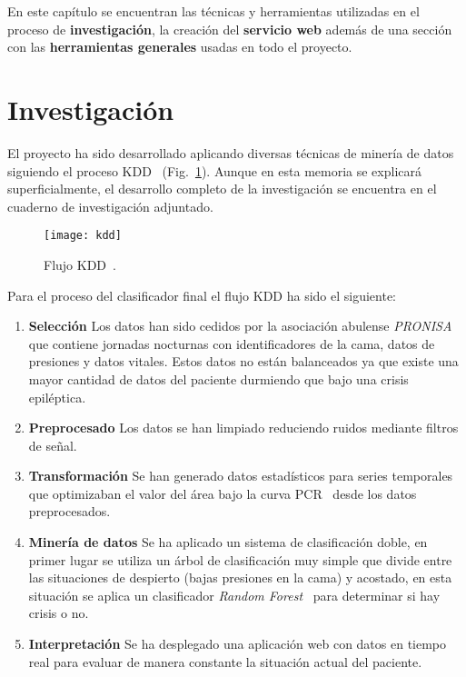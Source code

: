 
En este capítulo se encuentran las técnicas y herramientas utilizadas en el proceso de \textbf{investigación}, la creación del \textbf{servicio web} además de una sección con las \textbf{herramientas generales} usadas en todo el proyecto.

\section{Investigación}

El proyecto ha sido desarrollado aplicando diversas técnicas de minería de datos siguiendo el proceso KDD~\cite{ubu:mineria1} (Fig.~\ref{fig:kdd}). Aunque en esta memoria se explicará superficialmente, el desarrollo completo de la investigación se encuentra en el cuaderno de investigación adjuntado.

\begin{figure}
	\centering
	\texttt{[image: kdd]}
	\caption{Flujo KDD~\cite{fayyad1996data}.}
	\label{fig:kdd}
\end{figure}

Para el proceso del clasificador final el flujo KDD ha sido el siguiente:

\begin{enumerate}
	\item \textbf{Selección}
		Los datos han sido cedidos por la asociación abulense \textit{PRONISA} que contiene jornadas nocturnas con identificadores de la cama, datos de presiones y datos vitales. Estos datos no están balanceados ya que existe una mayor cantidad de datos del paciente durmiendo que bajo una crisis epiléptica.
	\item \textbf{Preprocesado}
		Los datos se han limpiado reduciendo ruidos mediante filtros de señal.
	\item \textbf{Transformación}
		Se han generado datos estadísticos para series temporales que optimizaban el valor del área bajo la curva PCR~\cite{saito2015precision} desde los datos preprocesados.
	\item \textbf{Minería de datos}
		Se ha aplicado un sistema de clasificación doble, en primer lugar se utiliza un árbol de clasificación muy simple que divide entre las situaciones de despierto (bajas presiones en la cama) y acostado, en esta situación se aplica un clasificador \textit{Random Forest}~\cite{breiman2001random} para determinar si hay crisis o no.
	\item \textbf{Interpretación}
		Se ha desplegado una aplicación web con datos en tiempo real para evaluar de manera constante la situación actual del paciente.
\end{enumerate}

